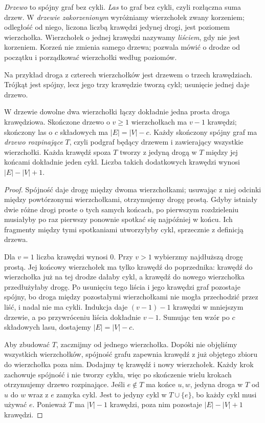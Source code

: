 \begin{definicja}
\label{def:drzewo-grafowe}
\emph{Drzewo} to spójny graf bez cykli. \emph{Las} to graf
bez cykli, czyli rozłączna suma drzew. W \emph{drzewie
zakorzenionym} wyróżniamy wierzchołek zwany korzeniem;
odległość od niego, liczona liczbą krawędzi jedynej
drogi, jest poziomem wierzchołka. Wierzchołek o jednej
krawędzi nazywamy \emph{liściem}, gdy nie jest korzeniem.
Korzeń nie zmienia samego drzewa; pozwala mówić o drodze
od początku i porządkować wierzchołki według poziomów.
\end{definicja}

Na przykład droga z czterech wierzchołków jest drzewem
o trzech krawędziach. Trójkąt jest spójny, lecz jego
trzy krawędzie tworzą cykl; usunięcie jednej daje drzewo.

\begin{stwierdzenie}
\label{prop:drzewo-rozpinajace}
W drzewie dowolne dwa wierzchołki łączy dokładnie jedna
prosta droga krawędziowa. Skończone drzewo o $v\geq1$
wierzchołkach ma $v-1$ krawędzi; skończony las o $c$
składowych ma $|E|=|V|-c$.
Każdy skończony spójny graf ma \emph{drzewo rozpinające}
$T$, czyli podgraf będący drzewem i zawierający wszystkie
wierzchołki. Każda krawędź spoza $T$ tworzy z jedyną
drogą w $T$ między jej końcami dokładnie jeden cykl.
Liczba takich dodatkowych krawędzi wynosi $|E|-|V|+1$.
\end{stwierdzenie}
\begin{proof}
Spójność daje drogę między dwoma wierzchołkami;
usuwając z niej odcinki między powtórzonymi
wierzchołkami, otrzymujemy drogę prostą.
Gdyby istniały dwie różne drogi proste o tych samych
końcach, po pierwszym rozdzieleniu musiałyby po raz
pierwszy ponownie spotkać się najpóźniej w końcu.
Ich fragmenty między tymi spotkaniami utworzyłyby
cykl, sprzecznie z definicją drzewa.

Dla $v=1$ liczba krawędzi wynosi $0$.
Przy $v>1$ wybierzmy najdłuższą drogę prostą.
Jej końcowy wierzchołek ma tylko krawędź do
poprzednika: krawędź do wierzchołka już na tej
drodze dałaby cykl, a krawędź do nowego
wierzchołka przedłużyłaby drogę.
Po usunięciu tego liścia i jego krawędzi graf
pozostaje spójny, bo droga między pozostałymi
wierzchołkami nie mogła przechodzić przez liść,
i nadal nie ma cykli. Indukcja daje
$(v-1)-1$ krawędzi w mniejszym drzewie,
a po przywróceniu liścia dokładnie $v-1$.
Sumując ten wzór po $c$ składowych lasu,
dostajemy $|E|=|V|-c$.

Aby zbudować $T$, zacznijmy od jednego wierzchołka.
Dopóki nie objęliśmy wszystkich wierzchołków,
spójność grafu zapewnia krawędź z już objętego
zbioru do wierzchołka poza nim. Dodajmy tę
krawędź i nowy wierzchołek. Każdy krok zachowuje
spójność i nie tworzy cyklu, więc po skończenie
wielu krokach otrzymujemy drzewo rozpinające.
Jeśli $e\notin T$ ma końce $u,w$, jedyna droga
w $T$ od $u$ do $w$ wraz z $e$ zamyka cykl.
Jest to jedyny cykl w $T\cup\{e\}$, bo każdy
cykl musi używać $e$. Ponieważ $T$ ma $|V|-1$
krawędzi, poza nim pozostaje $|E|-|V|+1$ krawędzi.
\end{proof}


